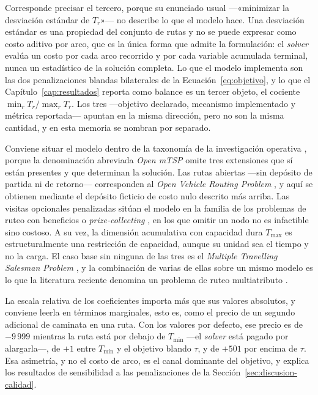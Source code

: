 Corresponde precisar el tercero, porque su enunciado usual ---«minimizar la
desviación estándar de $T_r$»--- no describe lo que el modelo hace. Una desviación
estándar es una propiedad del conjunto de rutas y no se puede expresar como costo
aditivo por arco, que es la única forma que admite la formulación: el
\textit{solver} evalúa un costo por cada arco recorrido y por cada variable
acumulada terminal, nunca un estadístico de la solución completa. Lo que el modelo
implementa son las dos penalizaciones blandas bilaterales de la
Ecuación~\ref{eq:objetivo}, y lo que el Capítulo~\ref{cap:resultados} reporta como
balance es un tercer objeto, el cociente $\min_r T_r / \max_r T_r$. Los tres
---objetivo declarado, mecanismo implementado y métrica reportada--- apuntan en la
misma dirección, pero no son la misma cantidad, y en esta memoria se nombran por
separado.

Conviene situar el modelo dentro de la taxonomía de la investigación operativa
\citep{toth2014vehicle}, porque la denominación abreviada \textit{Open mTSP} omite
tres extensiones que sí están presentes y que determinan la solución. Las rutas
abiertas ---sin depósito de partida ni de retorno--- corresponden al \textit{Open
Vehicle Routing Problem} \citep{li2007open}, y aquí se obtienen mediante el depósito
ficticio de costo nulo descrito más arriba. Las visitas opcionales penalizadas sitúan
el modelo en la familia de los problemas de ruteo con beneficios o
\textit{prize-collecting} \citep{balas1989prize,feillet2005traveling}, en los que
omitir un nodo no es infactible sino costoso. A su vez, la dimensión acumulativa con capacidad
dura $T_{\max}$ es estructuralmente una restricción de capacidad, aunque su unidad sea
el tiempo y no la carga. El caso base sin ninguna de las tres es el \textit{Multiple
Travelling Salesman Problem} \citep{bektas2006multiple,laporte1992traveling}, y la
combinación de varias de ellas sobre un mismo modelo es lo que la literatura reciente
denomina un problema de ruteo multiatributo \citep{vidal2013heuristics}.

La escala relativa de los coeficientes importa más que sus valores absolutos, y
conviene leerla en términos marginales, esto es, como el precio de un segundo
adicional de caminata en una ruta. Con los valores por defecto, ese precio es de
$-9\,999$ mientras la ruta está por debajo de $T_{\min}$ ---el \textit{solver} está
pagado por alargarla---, de $+1$ entre $T_{\min}$ y el objetivo blando $\tau$, y de
$+501$ por encima de $\tau$. Esa asimetría, y no el costo de arco, es el canal
dominante del objetivo, y explica los resultados de sensibilidad a las
penalizaciones de la Sección~\ref{sec:discusion-calidad}.

